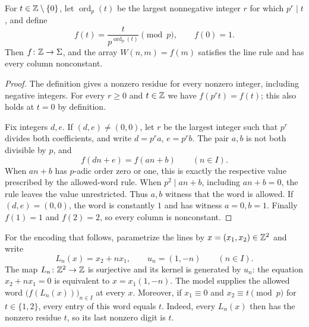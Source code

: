 \begin{lemma}
\label{word:model}
For $t\in\mathbb Z\setminus\{0\}$, let $\operatorname{ord}_p(t)$ be the
largest nonnegative integer $r$ for which $p^r\mid t$, and define
\[
    f(t)=\frac{t}{p^{\operatorname{ord}_p(t)}}\pmod p,
    \qquad f(0)=1.
\]
Then $f\colon\mathbb Z\to\Sigma$, and the array $W(n,m)=f(m)$ satisfies the
line rule and has every column nonconstant.
\end{lemma}

\begin{proof}
The definition gives a nonzero residue for every nonzero integer,
including negative integers.  For every $r\geq0$ and $t\in\mathbb Z$ we have
$f(p^rt)=f(t)$; this also holds at $t=0$ by definition.

Fix integers $d,e$.  If $(d,e)\ne(0,0)$, let $r$ be the largest integer
such that $p^r$ divides both coefficients, and write $d=p^ra$, $e=p^rb$.
The pair $a,b$ is not both divisible by $p$, and
\[
    f(dn+e)=f(an+b)\qquad(n\in I).
\]
When $an+b$ has $p$-adic order zero or one, this is exactly the
respective value prescribed by the allowed-word rule.  When
$p^2\mid an+b$, including $an+b=0$, the rule leaves the value
unrestricted.  Thus $a,b$ witness that the word is allowed.  If
$(d,e)=(0,0)$, the word is constantly $1$ and has witness $a=0,b=1$.
Finally $f(1)=1$ and $f(2)=2$, so every column is nonconstant.
\end{proof}

For the encoding that follows, parametrize the lines by
$x=(x_1,x_2)\in\mathbb Z^2$ and write
\begin{equation}
\label{word:line-maps}
    L_n(x)=x_2+nx_1,\qquad u_n=(1,-n)\qquad(n\in I).
\end{equation}
The map $L_n\colon\mathbb Z^2\to\mathbb Z$ is surjective and its kernel is generated
by $u_n$: the equation $x_2+nx_1=0$ is equivalent to
$x=x_1(1,-n)$.  The model supplies the allowed word
$\bigl(f(L_n(x))\bigr)_{n\in I}$ at every $x$.  Moreover, if
$x_1\equiv0$ and $x_2\equiv t\pmod p$ for $t\in\{1,2\}$, every entry
of this word equals $t$.  Indeed, every $L_n(x)$ then has the nonzero
residue $t$, so its last nonzero digit is $t$.
